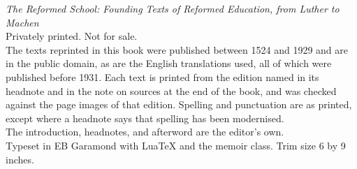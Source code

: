 \vspace*{\fill}
\begin{flushleft}\small
\textit{The Reformed School: Founding Texts of Reformed Education, from Luther to Machen}\\[0.5\onelineskip]
Privately printed. Not for sale.\\[0.5\onelineskip]
The texts reprinted in this book were published between 1524 and 1929 and are in the public domain, as are the English translations used, all of which were published before 1931. Each text is printed from the edition named in its headnote and in the note on sources at the end of the book, and was checked against the page images of that edition. Spelling and punctuation are as printed, except where a headnote says that spelling has been modernised.\\[0.5\onelineskip]
The introduction, headnotes, and afterword are the editor's own.\\[0.5\onelineskip]
Typeset in EB Garamond with Lua\TeX{} and the memoir class. Trim size 6 by 9 inches.
\end{flushleft}
